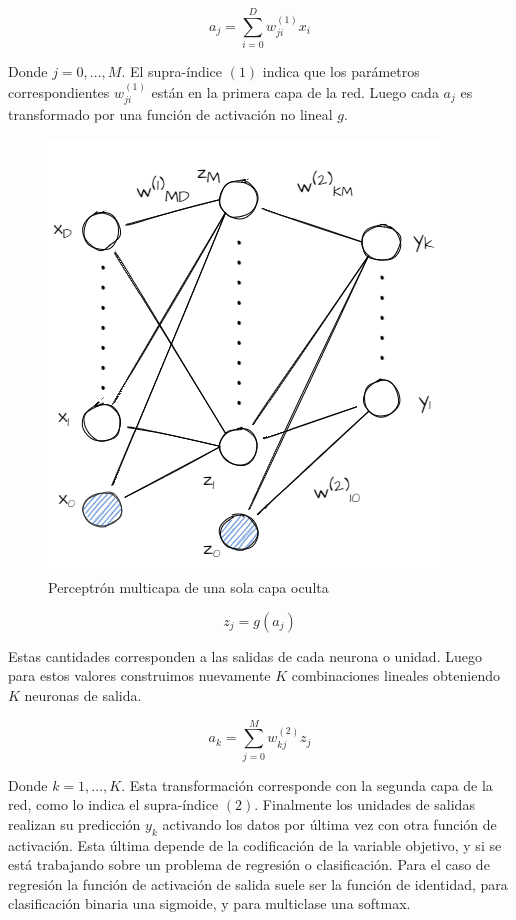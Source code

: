 \begin{equation}
    a_j = \sum_{i = 0}^{D} w_{ji}^{(1)} x_{i}
\end{equation}

Donde $j = 0,..., M$. El supra-índice $(1)$ indica que los parámetros
correspondientes $w_{ji}^{(1)}$ están en la primera capa de la red. Luego cada
$a_j$ es transformado por una función de activación no lineal $g$.

\begin{figure}
    \centering
    \includegraphics[scale=0.5]{figures/multilayer_perceptron.png}
    \caption{Perceptrón multicapa de una sola capa oculta}
    \label{fig:nn_multilayer_perceptron}
\end{figure}

\begin{equation}
    z_j = g(a_j)
\end{equation}

Estas cantidades corresponden a las salidas de cada neurona o unidad. Luego para
estos valores construimos nuevamente $K$ combinaciones lineales obteniendo $K$
neuronas de salida.

\begin{equation}
    a_k = \sum_{j=0}^{M} w_{kj}^{(2)}z_j
\end{equation}

Donde $k= 1,..., K$. Esta transformación corresponde con la segunda capa de la
red, como lo indica el supra-índice $(2)$. Finalmente los unidades de salidas
realizan su predicción $y_k$ activando los datos por última vez con otra función
de activación. Esta última depende de la codificación de la variable objetivo, y
si se está trabajando sobre un problema de regresión o clasificación. Para el
caso de regresión la función de activación de salida suele ser la función de
identidad, para clasificación binaria una sigmoide, y para multiclase una softmax.

